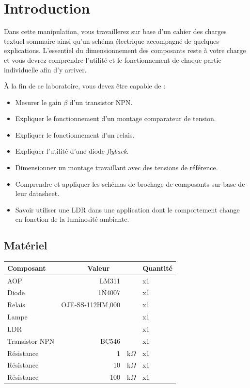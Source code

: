 \documentclass{../../template/labo}
\author{GEI}
\begin{document}

\section{Introduction}
Dans cette manipulation, vous travaillerez sur base  d'un cahier des charges textuel sommaire ainsi qu'un schéma électrique accompagné de quelques explications.
L'essentiel du dimensionnement des composants reste à votre charge et vous devrez comprendre l'utilité et le fonctionnement de chaque partie individuelle afin d'y arriver.

À la fin de ce laboratoire, vous devez être capable de :
\begin{itemize}
\item Mesurer le gain $\beta$ d'un transistor NPN.
\item Expliquer le fonctionnement d'un montage comparateur de tension.
\item Expliquer le fonctionnement d'un relais.
\item Expliquer l'utilité d'une diode \textit{flyback}.
\item Dimensionner un montage travaillant avec des tensions de référence.
\item Comprendre et appliquer les schémas de brochage de composants sur base de leur datasheet.
\item Savoir utiliser une LDR dans une application dont le comportement change en fonction de la luminosité ambiante.
\end{itemize}

\subsection{Matériel}

\begin{center}
	\begin{tabular}{p{}rlp{}}
		Composant & \multicolumn{2}{c}{Valeur} & Quantité \\\toprule
		\multirow{1}{*}{AOP} & LM311 & & x1 \\\midrule
		\multirow{1}{*}{Diode} & 1N4007 & & x1 \\\midrule
		\multirow{1}{*}{Relais} & OJE-SS-112HM,000 & & x1 \\\midrule
		\multirow{1}{*}{Lampe} & & & x1 \\\midrule
		\multirow{1}{*}{LDR} & & & x1 \\\midrule
		\multirow{1}{*}{Transistor NPN} & BC546 & & x1 \\\midrule
		\multirow{1}{*}{Résistance} 	& 1 & k$\Omega$ & x1 \\\midrule
		\multirow{1}{*}{Résistance} 	& 10 & k$\Omega$ & x1 \\\midrule
		\multirow{1}{*}{Résistance} 	& 100 & k$\Omega$ & x1 \\\midrule
	\end{tabular}
\end{center}
\clearpage
\end{document}
